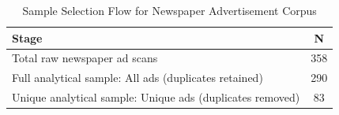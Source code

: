 \begin{table}[ht]
\centering
\begin{tabular}{p{11cm}c}
  \hline
Stage & N \\ 
  \hline
Total raw newspaper ad scans & 358 \\ 
  Full analytical sample: All ads (duplicates retained) & 290 \\ 
  Unique analytical sample: Unique ads (duplicates removed) &  83 \\ 
   \hline
\end{tabular}
\caption{Sample Selection Flow for Newspaper Advertisement Corpus} 
\end{table}
